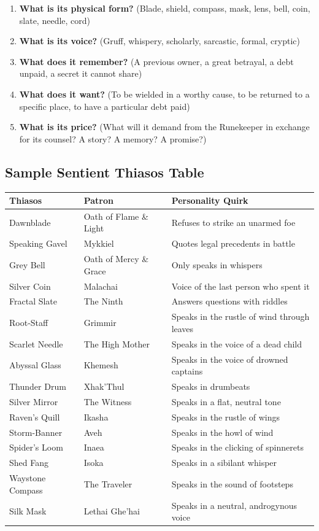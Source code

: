 \begin{enumerate}
\item \textbf{What is its physical form?} (Blade, shield, compass, mask, lens, bell, coin, slate, needle, cord)
\item \textbf{What is its voice?} (Gruff, whispery, scholarly, sarcastic, formal, cryptic)
\item \textbf{What does it remember?} (A previous owner, a great betrayal, a debt unpaid, a secret it cannot share)
\item \textbf{What does it want?} (To be wielded in a worthy cause, to be returned to a specific place, to have a particular debt paid)
\item \textbf{What is its price?} (What will it demand from the Runekeeper in exchange for its counsel? A story? A memory? A promise?)
\end{enumerate}

\subsection{Sample Sentient Thiasos Table}

\begin{tabular}{lll}
\textbf{Thiasos} & \textbf{Patron} & \textbf{Personality Quirk} \\
\hline
Dawnblade & Oath of Flame \& Light & Refuses to strike an unarmed foe \\
Speaking Gavel & Mykkiel & Quotes legal precedents in battle \\
Grey Bell & Oath of Mercy \& Grace & Only speaks in whispers \\
Silver Coin & Malachai & Voice of the last person who spent it \\
Fractal Slate & The Ninth & Answers questions with riddles \\
Root-Staff & Grimmir & Speaks in the rustle of wind through leaves \\
Scarlet Needle & The High Mother & Speaks in the voice of a dead child \\
Abyssal Glass & Khemesh & Speaks in the voice of drowned captains \\
Thunder Drum & Xhak'Thul & Speaks in drumbeats \\
Silver Mirror & The Witness & Speaks in a flat, neutral tone \\
Raven's Quill & Ikasha & Speaks in the rustle of wings \\
Storm-Banner & Aveh & Speaks in the howl of wind \\
Spider's Loom & Inaea & Speaks in the clicking of spinnerets \\
Shed Fang & Isoka & Speaks in a sibilant whisper \\
Waystone Compass & The Traveler & Speaks in the sound of footsteps \\
Silk Mask & Lethai Ghe'hai & Speaks in a neutral, androgynous voice \\
\end{tabular}

